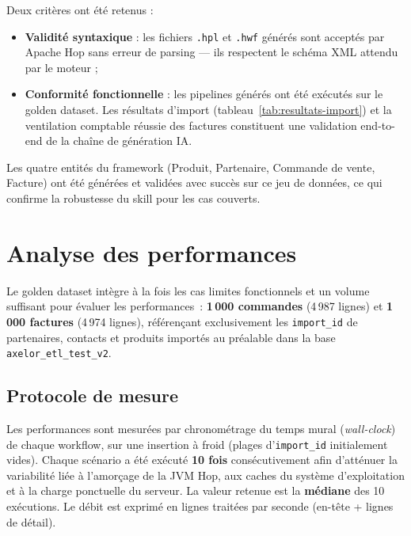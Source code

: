 Deux critères ont été retenus :

\begin{itemize}
  \item \textbf{Validité syntaxique} : les fichiers \texttt{.hpl} et \texttt{.hwf} générés sont acceptés par Apache Hop sans erreur de parsing — ils respectent le schéma XML attendu par le moteur ;
  \item \textbf{Conformité fonctionnelle} : les pipelines générés ont été exécutés sur le golden dataset. Les résultats d'import (tableau~\ref{tab:resultats-import}) et la ventilation comptable réussie des factures constituent une validation end-to-end de la chaîne de génération IA.
\end{itemize}

Les quatre entités du framework (Produit, Partenaire, Commande de vente, Facture) ont été générées et validées avec succès sur ce jeu de données, ce qui confirme la robustesse du skill pour les cas couverts.

\section{Analyse des performances}

Le golden dataset intègre à la fois les cas limites fonctionnels et un volume suffisant pour évaluer les performances~: \textbf{1\,000 commandes} (4\,987 lignes) et \textbf{1\,000 factures} (4\,974 lignes), référençant exclusivement les \texttt{import\_id} de partenaires, contacts et produits importés au préalable dans la base \texttt{axelor\_etl\_test\_v2}.

\subsection{Protocole de mesure}

Les performances sont mesurées par chronométrage du temps mural (\emph{wall-clock}) de chaque workflow, sur une insertion à froid (plages d'\texttt{import\_id} initialement vides). Chaque scénario a été exécuté \textbf{10 fois} consécutivement afin d'atténuer la variabilité liée à l'amorçage de la JVM Hop, aux caches du système d'exploitation et à la charge ponctuelle du serveur. La valeur retenue est la \textbf{médiane} des 10 exécutions. Le débit est exprimé en lignes traitées par seconde (en-tête + lignes de détail).

